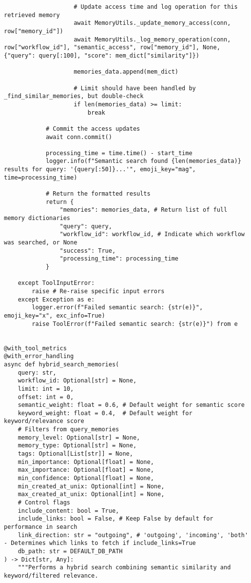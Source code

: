 \documentclass[12pt,a4paper]{article}
\begin{document}
\begin{pageablecode}
\begin{verbatim}
                    # Update access time and log operation for this retrieved memory
                    await MemoryUtils._update_memory_access(conn, row["memory_id"])
                    await MemoryUtils._log_memory_operation(conn, row["workflow_id"], "semantic_access", row["memory_id"], None, {"query": query[:100], "score": mem_dict["similarity"]})

                    memories_data.append(mem_dict)

                    # Limit should have been handled by _find_similar_memories, but double-check
                    if len(memories_data) >= limit:
                        break

            # Commit the access updates
            await conn.commit()

            processing_time = time.time() - start_time
            logger.info(f"Semantic search found {len(memories_data)} results for query: '{query[:50]}...'", emoji_key="mag", time=processing_time)

            # Return the formatted results
            return {
                "memories": memories_data, # Return list of full memory dictionaries
                "query": query,
                "workflow_id": workflow_id, # Indicate which workflow was searched, or None
                "success": True,
                "processing_time": processing_time
            }

    except ToolInputError:
        raise # Re-raise specific input errors
    except Exception as e:
        logger.error(f"Failed semantic search: {str(e)}", emoji_key="x", exc_info=True)
        raise ToolError(f"Failed semantic search: {str(e)}") from e
    

@with_tool_metrics
@with_error_handling
async def hybrid_search_memories(
    query: str,
    workflow_id: Optional[str] = None,
    limit: int = 10,
    offset: int = 0,
    semantic_weight: float = 0.6, # Default weight for semantic score
    keyword_weight: float = 0.4,  # Default weight for keyword/relevance score
    # Filters from query_memories
    memory_level: Optional[str] = None,
    memory_type: Optional[str] = None,
    tags: Optional[List[str]] = None,
    min_importance: Optional[float] = None,
    max_importance: Optional[float] = None,
    min_confidence: Optional[float] = None,
    min_created_at_unix: Optional[int] = None,
    max_created_at_unix: Optional[int] = None,
    # Control flags
    include_content: bool = True,
    include_links: bool = False, # Keep False by default for performance in search
    link_direction: str = "outgoing", # 'outgoing', 'incoming', 'both' - Determines which links to fetch if include_links=True
    db_path: str = DEFAULT_DB_PATH
) -> Dict[str, Any]:
    """Performs a hybrid search combining semantic similarity and keyword/filtered relevance.


\end{verbatim}
\end{pageablecode}
\end{document}
